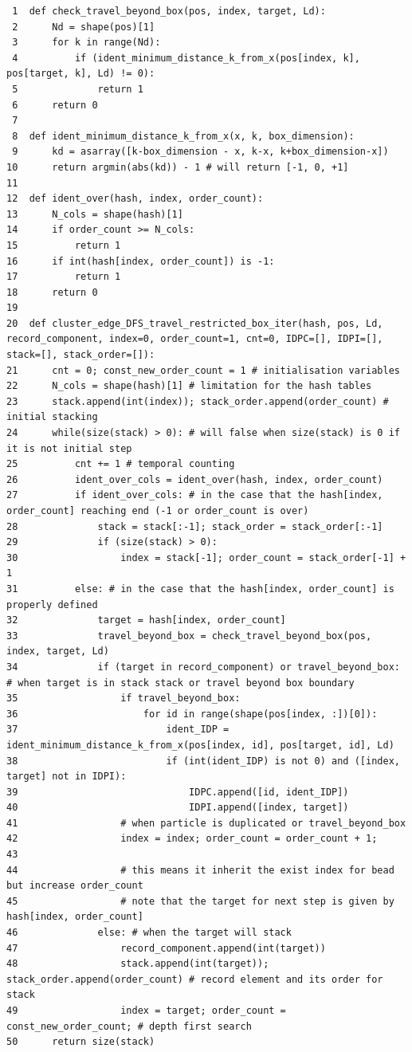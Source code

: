\documentclass[11pt]{article}
\begin{document}
\begin{verbatim}
 1  def check_travel_beyond_box(pos, index, target, Ld):
 2      Nd = shape(pos)[1]
 3      for k in range(Nd):
 4          if (ident_minimum_distance_k_from_x(pos[index, k], pos[target, k], Ld) != 0):
 5              return 1
 6      return 0
 7  
 8  def ident_minimum_distance_k_from_x(x, k, box_dimension):
 9      kd = asarray([k-box_dimension - x, k-x, k+box_dimension-x])
10      return argmin(abs(kd)) - 1 # will return [-1, 0, +1]
11  
12  def ident_over(hash, index, order_count):
13      N_cols = shape(hash)[1]
14      if order_count >= N_cols:
15          return 1
16      if int(hash[index, order_count]) is -1:
17          return 1
18      return 0
19  
20  def cluster_edge_DFS_travel_restricted_box_iter(hash, pos, Ld, record_component, index=0, order_count=1, cnt=0, IDPC=[], IDPI=[], stack=[], stack_order=[]):
21      cnt = 0; const_new_order_count = 1 # initialisation variables
22      N_cols = shape(hash)[1] # limitation for the hash tables
23      stack.append(int(index)); stack_order.append(order_count) # initial stacking
24      while(size(stack) > 0): # will false when size(stack) is 0 if it is not initial step
25          cnt += 1 # temporal counting 
26          ident_over_cols = ident_over(hash, index, order_count)
27          if ident_over_cols: # in the case that the hash[index, order_count] reaching end (-1 or order_count is over)
28              stack = stack[:-1]; stack_order = stack_order[:-1]
29              if (size(stack) > 0):
30                  index = stack[-1]; order_count = stack_order[-1] + 1
31          else: # in the case that the hash[index, order_count] is properly defined
32              target = hash[index, order_count]
33              travel_beyond_box = check_travel_beyond_box(pos, index, target, Ld)
34              if (target in record_component) or travel_beyond_box: # when target is in stack stack or travel beyond box boundary
35                  if travel_beyond_box: 
36                      for id in range(shape(pos[index, :])[0]):
37                          ident_IDP = ident_minimum_distance_k_from_x(pos[index, id], pos[target, id], Ld)
38                          if (int(ident_IDP) is not 0) and ([index, target] not in IDPI):
39                              IDPC.append([id, ident_IDP])
40                              IDPI.append([index, target])
41                  # when particle is duplicated or travel_beyond_box
42                  index = index; order_count = order_count + 1;
43  
44                  # this means it inherit the exist index for bead but increase order_count
45                  # note that the target for next step is given by hash[index, order_count]
46              else: # when the target will stack
47                  record_component.append(int(target))
48                  stack.append(int(target)); stack_order.append(order_count) # record element and its order for stack
49                  index = target; order_count = const_new_order_count; # depth first search
50      return size(stack)
\end{verbatim}
\end{document}

